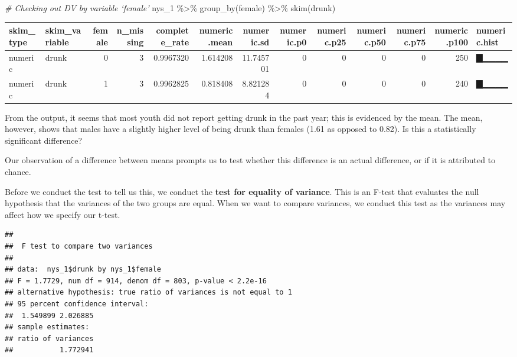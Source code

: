 \documentclass[
]{book}
\newenvironment{Shaded}{\begin{snugshade}}{\end{snugshade}}
\newcommand{\CommentTok}[1]{\textcolor[rgb]{0.56,0.35,0.01}{\textit{#1}}}
\newcommand{\FunctionTok}[1]{\textcolor[rgb]{0.00,0.00,0.00}{#1}}
\newcommand{\NormalTok}[1]{#1}
\newcommand{\SpecialCharTok}[1]{\textcolor[rgb]{0.00,0.00,0.00}{#1}}
\begin{document}
\begin{Shaded}
\begin{Highlighting}[]
\CommentTok{\# Checking out DV by variable ‘female’}
\NormalTok{nys\_1 }\SpecialCharTok{\%\textgreater{}\%} \FunctionTok{group\_by}\NormalTok{(female) }\SpecialCharTok{\%\textgreater{}\%} \FunctionTok{skim}\NormalTok{(drunk)}
\end{Highlighting}
\end{Shaded}

\begin{tabular}{l|l|r|r|r|r|r|r|r|r|r|r|l}
\hline
skim\_type & skim\_variable & female & n\_missing & complete\_rate & numeric.mean & numeric.sd & numeric.p0 & numeric.p25 & numeric.p50 & numeric.p75 & numeric.p100 & numeric.hist\\
\hline
numeric & drunk & 0 & 3 & 0.9967320 & 1.614208 & 11.745701 & 0 & 0 & 0 & 0 & 250 & ▇▁▁▁▁\\
\hline
numeric & drunk & 1 & 3 & 0.9962825 & 0.818408 & 8.821284 & 0 & 0 & 0 & 0 & 240 & ▇▁▁▁▁\\
\hline
\end{tabular}

From the output, it seems that most youth did not report getting drunk in the past year; this is evidenced by the mean. The mean, however, shows that males have a slightly higher level of being drunk than females (1.61 as opposed to 0.82). Is this a statistically significant difference?

Our observation of a difference between means prompts us to test whether this difference is an actual difference, or if it is attributed to chance.

Before we conduct the test to tell us this, we conduct the \textbf{test for equality of variance}. This is an F-test that evaluates the null hypothesis that the variances of the two groups are equal. When we want to compare variances, we conduct this test as the variances may affect how we specify our t-test.

\begin{Shaded}
\end{Shaded}

\begin{verbatim}
## 
##  F test to compare two variances
## 
## data:  nys_1$drunk by nys_1$female
## F = 1.7729, num df = 914, denom df = 803, p-value < 2.2e-16
## alternative hypothesis: true ratio of variances is not equal to 1
## 95 percent confidence interval:
##  1.549899 2.026885
## sample estimates:
## ratio of variances 
##           1.772941
\end{verbatim}
\end{document}
